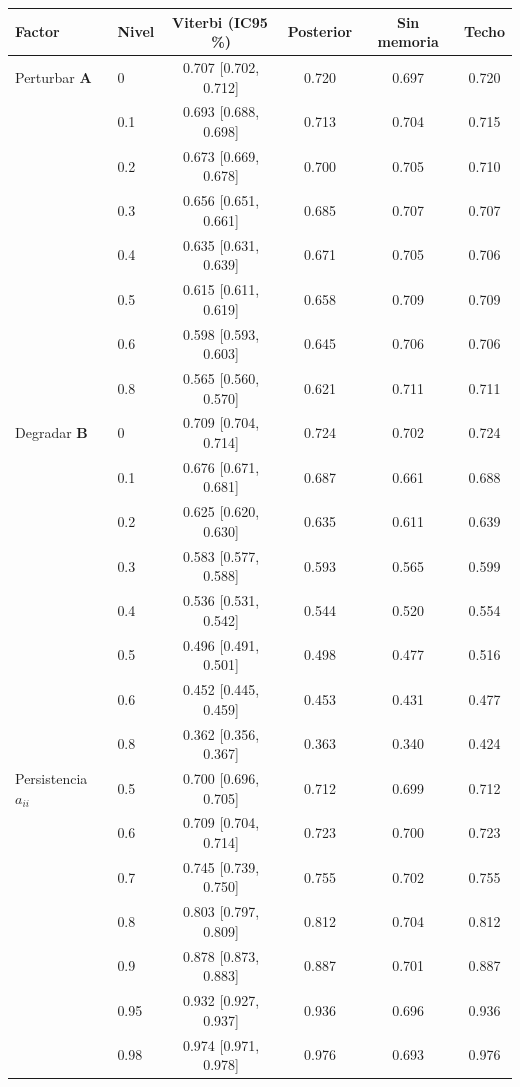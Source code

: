\begin{tabular}{llcccc}
\toprule
\textbf{Factor} & \textbf{Nivel} & \textbf{Viterbi (IC95\,\%)} & \textbf{Posterior} & \textbf{Sin memoria} & \textbf{Techo} \\
\midrule
Perturbar $\mathbf{A}$ & 0 & 0.707 {\scriptsize [0.702, 0.712]} & 0.720 & 0.697 & 0.720 \\
 & 0.1 & 0.693 {\scriptsize [0.688, 0.698]} & 0.713 & 0.704 & 0.715 \\
 & 0.2 & 0.673 {\scriptsize [0.669, 0.678]} & 0.700 & 0.705 & 0.710 \\
 & 0.3 & 0.656 {\scriptsize [0.651, 0.661]} & 0.685 & 0.707 & 0.707 \\
 & 0.4 & 0.635 {\scriptsize [0.631, 0.639]} & 0.671 & 0.705 & 0.706 \\
 & 0.5 & 0.615 {\scriptsize [0.611, 0.619]} & 0.658 & 0.709 & 0.709 \\
 & 0.6 & 0.598 {\scriptsize [0.593, 0.603]} & 0.645 & 0.706 & 0.706 \\
 & 0.8 & 0.565 {\scriptsize [0.560, 0.570]} & 0.621 & 0.711 & 0.711 \\
Degradar $\mathbf{B}$ & 0 & 0.709 {\scriptsize [0.704, 0.714]} & 0.724 & 0.702 & 0.724 \\
 & 0.1 & 0.676 {\scriptsize [0.671, 0.681]} & 0.687 & 0.661 & 0.688 \\
 & 0.2 & 0.625 {\scriptsize [0.620, 0.630]} & 0.635 & 0.611 & 0.639 \\
 & 0.3 & 0.583 {\scriptsize [0.577, 0.588]} & 0.593 & 0.565 & 0.599 \\
 & 0.4 & 0.536 {\scriptsize [0.531, 0.542]} & 0.544 & 0.520 & 0.554 \\
 & 0.5 & 0.496 {\scriptsize [0.491, 0.501]} & 0.498 & 0.477 & 0.516 \\
 & 0.6 & 0.452 {\scriptsize [0.445, 0.459]} & 0.453 & 0.431 & 0.477 \\
 & 0.8 & 0.362 {\scriptsize [0.356, 0.367]} & 0.363 & 0.340 & 0.424 \\
Persistencia $a_{ii}$ & 0.5 & 0.700 {\scriptsize [0.696, 0.705]} & 0.712 & 0.699 & 0.712 \\
 & 0.6 & 0.709 {\scriptsize [0.704, 0.714]} & 0.723 & 0.700 & 0.723 \\
 & 0.7 & 0.745 {\scriptsize [0.739, 0.750]} & 0.755 & 0.702 & 0.755 \\
 & 0.8 & 0.803 {\scriptsize [0.797, 0.809]} & 0.812 & 0.704 & 0.812 \\
 & 0.9 & 0.878 {\scriptsize [0.873, 0.883]} & 0.887 & 0.701 & 0.887 \\
 & 0.95 & 0.932 {\scriptsize [0.927, 0.937]} & 0.936 & 0.696 & 0.936 \\
 & 0.98 & 0.974 {\scriptsize [0.971, 0.978]} & 0.976 & 0.693 & 0.976 \\
\bottomrule
\end{tabular}
